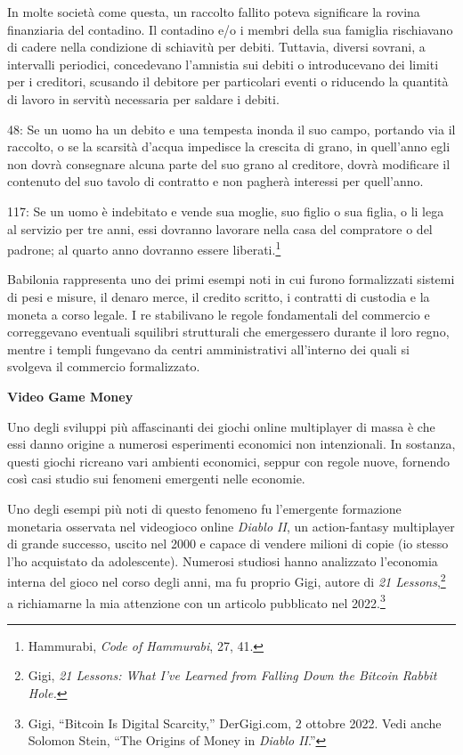 \documentclass[
  a5paper,
  smalldemyvopaper,10pt,twoside,onecolumn,openright,extrafontsizes,hidelinks]{memoir}
\renewenvironment{quote}%
               {\list{}{\rightmargin=.6cm\leftmargin=.6cm}%
                \itshape \item[]}%
               {\endlist}
\begin{document}
In molte società come questa, un raccolto fallito poteva significare la
rovina finanziaria del contadino. Il contadino e/o i membri della sua
famiglia rischiavano di cadere nella condizione di schiavitù per debiti.
Tuttavia, diversi sovrani, a intervalli periodici, concedevano
l'amnistia sui debiti o introducevano dei limiti per i creditori,
scusando il debitore per particolari eventi o riducendo la quantità di
lavoro in servitù necessaria per saldare i debiti.

\begin{quote}
48: Se un uomo ha un debito e una tempesta inonda il suo campo, portando
via il raccolto, o se la scarsità d'acqua impedisce la crescita di
grano, in quell'anno egli non dovrà consegnare alcuna parte del suo
grano al creditore, dovrà modificare il contenuto del suo tavolo di
contratto e non pagherà interessi per quell'anno.
\end{quote}

\begin{quote}
117: Se un uomo è indebitato e vende sua moglie, suo figlio o sua
figlia, o li lega al servizio per tre anni, essi dovranno lavorare nella
casa del compratore o del padrone; al quarto anno dovranno essere
liberati.\footnote{Hammurabi, \emph{Code of Hammurabi}, 27, 41.}
\end{quote}

Babilonia rappresenta uno dei primi esempi noti in cui furono
formalizzati sistemi di pesi e misure, il denaro merce, il credito
scritto, i contratti di custodia e la moneta a corso legale. I re
stabilivano le regole fondamentali del commercio e correggevano
eventuali squilibri strutturali che emergessero durante il loro regno,
mentre i templi fungevano da centri amministrativi all'interno dei quali
si svolgeva il commercio formalizzato.

\textbf{Video Game Money}

Uno degli sviluppi più affascinanti dei giochi online multiplayer di
massa è che essi danno origine a numerosi esperimenti economici non
intenzionali. In sostanza, questi giochi ricreano vari ambienti
economici, seppur con regole nuove, fornendo così casi studio sui
fenomeni emergenti nelle economie.

Uno degli esempi più noti di questo fenomeno fu l'emergente formazione
monetaria osservata nel videogioco online \emph{Diablo II}, un
action-fantasy multiplayer di grande successo, uscito nel 2000 e capace
di vendere milioni di copie (io stesso l'ho acquistato da adolescente).
Numerosi studiosi hanno analizzato l'economia interna del gioco nel
corso degli anni, ma fu proprio Gigi, autore di \emph{21
Lessons},\footnote{Gigi, \emph{21 Lessons: What I've Learned from
  Falling Down the Bitcoin Rabbit Hole.}} a richiamarne la mia
attenzione con un articolo pubblicato nel 2022.\footnote{Gigi, ``Bitcoin
  Is Digital Scarcity,'' DerGigi.com, 2 ottobre 2022. Vedi anche Solomon
  Stein, ``The Origins of Money in \emph{Diablo II}.''}
\end{document}
